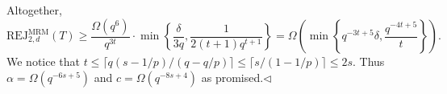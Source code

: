 Altogether,
\[\mathrm{REJ}_{2,d}^{\mathrm{MRM}}(T)\geq\frac{\Omega(q^6)}{q^{3t}}\cdot\min\left\{\frac\delta{3q},\frac1{2(t+1)q^{t+1}}\right\}=\Omega\left(\min\left\{q^{-3t+5}\delta,\frac{q^{-4t+5}}t\right\}\right).\]
We notice that $t\leq\lceil q(s-1/p)/(q-q/p)\rceil\leq\lceil s/(1-1/p)\rceil\leq2s$. Thus $\alpha=\Omega(q^{-6s+5})$ and $c=\Omega(q^{-8s+4})$ as promised.\hfill$\triangleleft$
